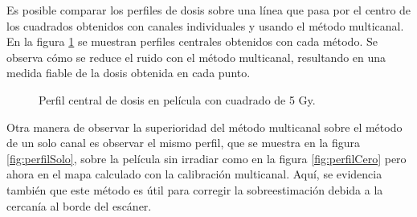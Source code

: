 Es posible comparar los perfiles de dosis sobre una línea que pasa por el centro de los cuadrados obtenidos con canales individuales y usando el método multicanal. En la figura \ref{fig:perfilesMapaCuadrado} se muestran perfiles centrales obtenidos con cada método. Se observa cómo se reduce el ruido con el método multicanal, resultando en una medida fiable de la dosis obtenida en cada punto. 
\begin{figure}[H]
	\centering
	\hfill
	\caption{Perfil central de dosis en película con cuadrado de 5 Gy.}
	\label{fig:perfilesMapaCuadrado}
\end{figure}

Otra manera de observar la superioridad del método multicanal sobre el método de un solo canal es observar el mismo perfil, que se muestra en la figura \ref{fig:perfilSolo}, sobre la película sin irradiar como en la figura \ref{fig:perfilCero} pero ahora en el mapa calculado con la calibración multicanal. Aquí, se evidencia también que este método es útil para corregir la sobreestimación debida a la cercanía al borde del escáner.\\

